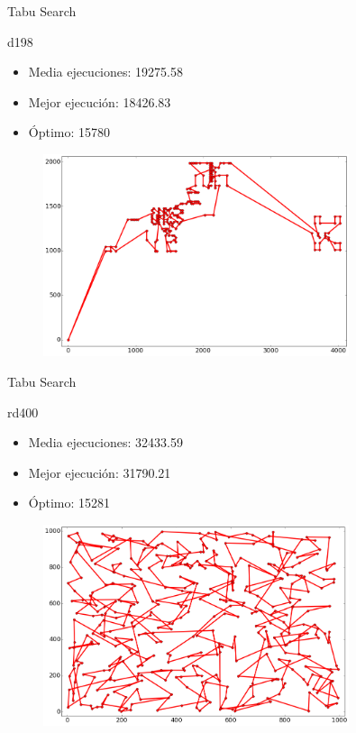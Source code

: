 \documentclass[ignorenonframetext,]{beamer}
\begin{document}
\begin{frame}{Tabu Search}

\begin{block}{d198}

\begin{itemize}
\item
  Media ejecuciones: 19275.58
\item
  Mejor ejecución: 18426.83
\item
  Óptimo: 15780
\end{itemize}

\begin{figure}[htbp]
\centering
\includegraphics[width=0.8\textwidth]{./images/d198ts.png}
\end{figure}

\end{block}

\end{frame}

\begin{frame}{Tabu Search}

\begin{block}{rd400}

\begin{itemize}
\item
  Media ejecuciones: 32433.59
\item
  Mejor ejecución: 31790.21
\item
  Óptimo: 15281
\end{itemize}

\begin{figure}[htbp]
\centering
\includegraphics[width=0.8\textwidth]{./images/rd400ts.png}
\end{figure}

\end{block}

\end{frame}
\end{document}
